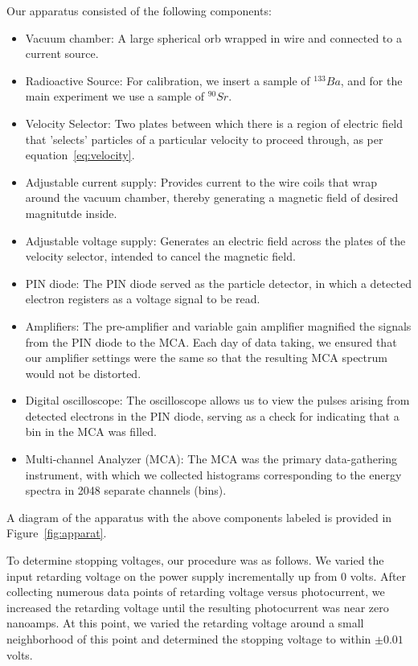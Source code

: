 \documentclass[aps,twocolumn,secnumarabic,balancelastpage,amsmath,amssymb,nofootinbib, floatfix]{revtex4-2}
\begin{document}
	Our apparatus consisted of the following components:
	\begin{itemize}
		\item Vacuum chamber: A large spherical orb wrapped in wire and connected to a current source. 
		\item Radioactive Source: For calibration, we insert a sample of $^{133}Ba$, and for the main experiment we use a sample of $^{90}Sr$. 
		\item Velocity Selector: Two plates between which there is a region of electric field that 'selects' particles of a particular velocity to proceed through, as per equation~\ref{eq:velocity}.
		\item Adjustable current supply: Provides current to the wire coils that wrap around the vacuum chamber, thereby generating a magnetic field of desired magnitutde inside. 
		\item Adjustable voltage supply: Generates an electric field across the plates of the velocity selector, intended to cancel the magnetic field. 
		\item PIN diode:  The PIN diode served as the particle detector, in which a detected electron registers as a voltage signal to be read.
		\item Amplifiers: The pre-amplifier and variable gain amplifier magnified the signals from the PIN diode to the MCA. Each day of data taking, we ensured that our amplifier settings were the same so that the resulting MCA spectrum would not be distorted. 
		\item Digital oscilloscope: The oscilloscope allows us to view the pulses arising from detected electrons in the PIN diode, serving as a check for indicating that a bin in the MCA was filled.
		\item Multi-channel Analyzer (MCA): The MCA was the primary data-gathering instrument, with which we collected histograms corresponding to the energy spectra in 2048 separate channels (bins). 
	\end{itemize}
	A diagram of the apparatus with the above components labeled is provided in Figure~\ref{fig:apparat}. 
	
	To determine stopping voltages, our procedure was as follows. We varied the input retarding voltage on the power supply incrementally up from 0 volts. After collecting numerous data points of retarding voltage versus photocurrent, we increased the retarding voltage until the resulting photocurrent was near zero nanoamps. At this point, we varied the retarding voltage around a small neighborhood of this point and determined the stopping voltage to within $\pm0.01$ volts.
\end{document}
